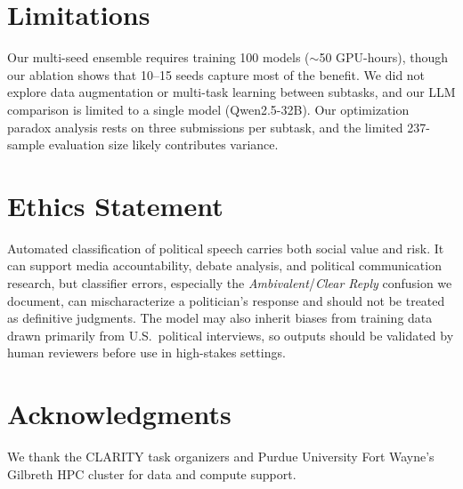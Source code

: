 \documentclass[11pt]{article}
\begin{document}
\section*{Limitations}

Our multi-seed ensemble requires training 100 models ($\sim$50 GPU-hours), though our ablation shows that 10--15 seeds capture most of the benefit. We did not explore data augmentation or multi-task learning between subtasks, and our LLM comparison is limited to a single model (Qwen2.5-32B). Our optimization paradox analysis rests on three submissions per subtask, and the limited 237-sample evaluation size likely contributes variance.

\section*{Ethics Statement}

Automated classification of political speech carries both social value and risk. It can support media accountability, debate analysis, and political communication research, but classifier errors, especially the \textit{Ambivalent}/\textit{Clear Reply} confusion we document, can mischaracterize a politician's response and should not be treated as definitive judgments. The model may also inherit biases from training data drawn primarily from U.S.\ political interviews, so outputs should be validated by human reviewers before use in high-stakes settings.

\section*{Acknowledgments}

We thank the CLARITY task organizers and Purdue University Fort Wayne's Gilbreth HPC cluster for data and compute support.

\raggedbottom

\end{document}
